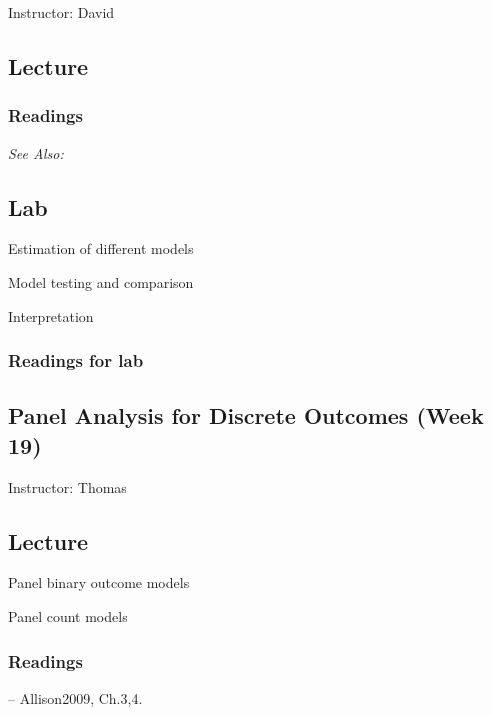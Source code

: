 \documentclass[11pt,a4paper]{article}
\newcommand{\textbook}[2][]{\noindent -- {#2}, {#1}.\vspace{.25em}\\}
\newcommand{\thomas}{\vspace{1em}\noindent Instructor: Thomas\vspace{1em}\\}
\newcommand{\david}{\vspace{1em}\noindent Instructor: David\vspace{1em}\\}
\newcommand{\seealso}{\noindent \emph{See Also:}\\}
\begin{document}
\david

\subsection*{Lecture}
\begin{itemize*}
\item %
\end{itemize*}

\subsubsection*{Readings}

\seealso


\subsection*{Lab}

\begin{itemize*}
\item Estimation of different models
\item Model testing and comparison
\item Interpretation
\end{itemize*}

\subsubsection*{Readings for lab}



\clearpage
\subsection{Panel Analysis for Discrete Outcomes (Week 19)}
\emph{}

\thomas


\subsection*{Lecture}
\begin{itemize*}
\item Panel binary outcome models
\item Panel count models
\end{itemize*}

\subsubsection*{Readings}
\textbook[Ch.3,4]{Allison2009}
\end{document}
